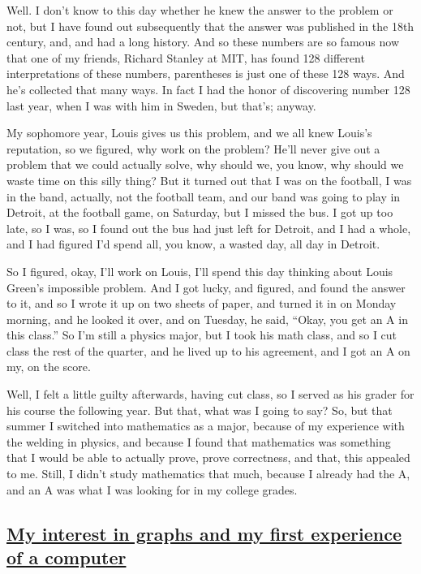 \documentclass[]{article}
\begin{document}
Well. I don't know to this day whether he knew the answer to the problem
or not, but I have found out subsequently that the answer was published
in the 18th century, and, and had a long history. And so these numbers
are so famous now that one of my friends, Richard Stanley at MIT, has
found 128 different interpretations of these numbers, parentheses is
just one of these 128 ways. And he's collected that many ways. In fact I
had the honor of discovering number 128 last year, when I was with him
in Sweden, but that's; anyway.

My sophomore year, Louis gives us this problem, and we all knew Louis's
reputation, so we figured, why work on the problem? He'll never give out
a problem that we could actually solve, why should we, you know, why
should we waste time on this silly thing? But it turned out that I was
on the football, I was in the band, actually, not the football team, and
our band was going to play in Detroit, at the football game, on
Saturday, but I missed the bus. I got up too late, so I was, so I found
out the bus had just left for Detroit, and I had a whole, and I had
figured I'd spend all, you know, a wasted day, all day in Detroit.

So I figured, okay, I'll work on Louis, I'll spend this day thinking
about Louis Green's impossible problem. And I got lucky, and figured,
and found the answer to it, and so I wrote it up on two sheets of paper,
and turned it in on Monday morning, and he looked it over, and on
Tuesday, he said, ``Okay, you get an A in this class.'' So I'm still a
physics major, but I took his math class, and so I cut class the rest of
the quarter, and he lived up to his agreement, and I got an A on my, on
the score.

Well, I felt a little guilty afterwards, having cut class, so I served
as his grader for his course the following year. But that, what was I
going to say? So, but that summer I switched into mathematics as a
major, because of my experience with the welding in physics, and because
I found that mathematics was something that I would be able to actually
prove, prove correctness, and that, this appealed to me. Still, I didn't
study mathematics that much, because I already had the A, and an A was
what I was looking for in my college grades.

\subsection{\texorpdfstring{\href{http://webofstories.com/play/17078}{My
interest in graphs and my first experience of a
computer}}{My interest in graphs and my first experience of a computer}}\label{my-interest-in-graphs-and-my-first-experience-of-a-computer}
\end{document}

